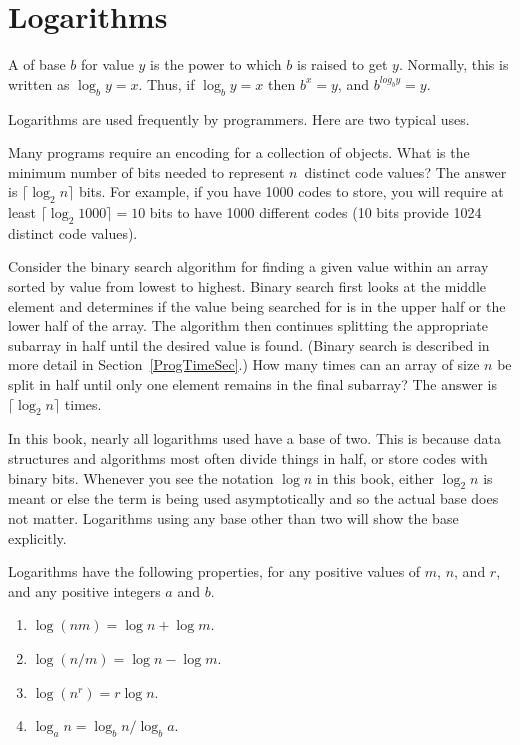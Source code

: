 \section{Logarithms}
\label{SecLog}

A  of base \(b\) for value \(y\) is the power to which
\(b\) is raised to get \(y\).
Normally, this is written as \(\log_b y = x\).
Thus, if \(\log_b y = x\) then \(b^x = y\),
and \(b^{log_b y} = y\).

Logarithms are used frequently by programmers.
Here are two typical uses.

\begin{example}
Many programs require an encoding for a collection of objects.
What is the minimum number of bits needed to represent \(n\)~distinct
code values?
The answer is \(\lceil \log_2 n \rceil\) bits.
For example, if you have 1000 codes to store, you will require at
least \(\lceil \log_2 1000 \rceil = 10\) bits to have 1000
different codes (10 bits provide 1024 distinct code values).
\end{example}

\begin{example}
Consider the binary search algorithm for finding a given value within
an array sorted by value from lowest to highest.
Binary search first looks at the middle element
and determines if the value being searched for is in the upper half or
the lower half of the array.
The algorithm then continues splitting the appropriate
subarray in half until the desired value is found.
(Binary search is described in more detail in
Section~\ref{ProgTimeSec}.)
How many times can an array of size \(n\) be split in half until only
one element remains in the final subarray?
The answer is \(\lceil \log_2 n \rceil\) times.
\end{example}

In this book, nearly all logarithms used have a base of two.
This is because data structures and algorithms most often divide
things in half, or store codes with binary bits.
Whenever you see the notation \(\log n\) in this book,
either \(\log_2 n\) is meant or else the term is being used
asymptotically and so the actual base does not matter.
Logarithms using any base other than two will show the base
explicitly.

Logarithms have the following properties, for any positive values of
\(m\), \(n\), and \(r\), and any positive integers \(a\) and \(b\).
\begin{enumerate}
\item
\(\log (nm) = \log n + \log m\).
\item
\(\log (n/m) = \log n - \log m\).
\item
\(\log (n^r) = r \log n\).
\item
\(\log_a n = \log_b n / \log_b a\).
\end{enumerate}

